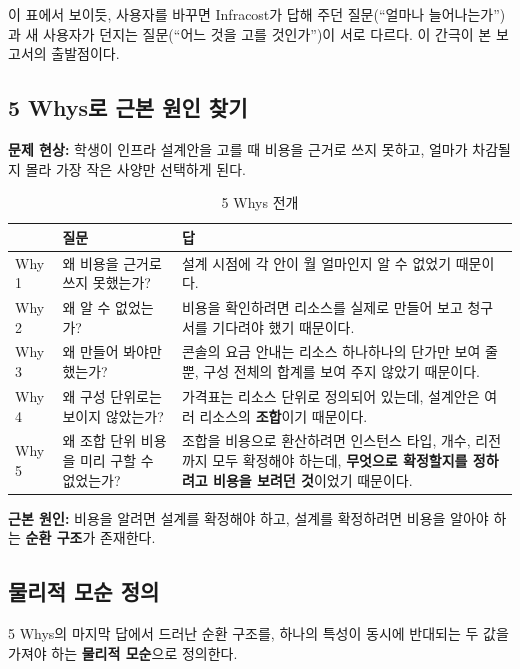 \documentclass[10pt,a4paper]{article}
\begin{document}
이 표에서 보이듯, 사용자를 바꾸면 Infracost가 답해 주던 질문(``얼마나 늘어나는가'')과 새 사용자가 던지는 질문(``어느 것을 고를 것인가'')이 서로 다르다. 이 간극이 본 보고서의 출발점이다.

\subsection{5 Whys로 근본 원인 찾기}

\textbf{문제 현상:} 학생이 인프라 설계안을 고를 때 비용을 근거로 쓰지 못하고, 얼마가 차감될지 몰라 가장 작은 사양만 선택하게 된다.

\begin{table}[!h]
\centering
\caption{5 Whys 전개}
\label{tab:fivewhys}
\footnotesize
\begin{tabularx}{\textwidth}{l Y Y}
\toprule
 & \textbf{질문} & \textbf{답} \\
\midrule
Why 1 & 왜 비용을 근거로 쓰지 못했는가? & 설계 시점에 각 안이 월 얼마인지 알 수 없었기 때문이다. \\
Why 2 & 왜 알 수 없었는가? & 비용을 확인하려면 리소스를 실제로 만들어 보고 청구서를 기다려야 했기 때문이다. \\
Why 3 & 왜 만들어 봐야만 했는가? & 콘솔의 요금 안내는 리소스 하나하나의 단가만 보여 줄 뿐, 구성 전체의 합계를 보여 주지 않았기 때문이다. \\
Why 4 & 왜 구성 단위로는 보이지 않았는가? & 가격표는 리소스 단위로 정의되어 있는데, 설계안은 여러 리소스의 \textbf{조합}이기 때문이다. \\
Why 5 & 왜 조합 단위 비용을 미리 구할 수 없었는가? & 조합을 비용으로 환산하려면 인스턴스 타입, 개수, 리전까지 모두 확정해야 하는데, \textbf{무엇으로 확정할지를 정하려고 비용을 보려던 것}이었기 때문이다. \\
\bottomrule
\end{tabularx}
\end{table}

\textbf{근본 원인:} 비용을 알려면 설계를 확정해야 하고, 설계를 확정하려면 비용을 알아야 하는 \textbf{순환 구조}가 존재한다.

\subsection{물리적 모순 정의}

5 Whys의 마지막 답에서 드러난 순환 구조를, 하나의 특성이 동시에 반대되는 두 값을 가져야 하는 \textbf{물리적 모순}으로 정의한다.
\end{document}
